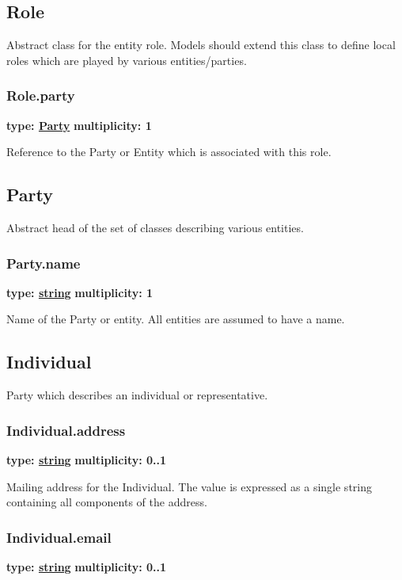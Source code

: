 \subsection{Role}
Abstract class for the entity role. Models should extend this class to define
local roles which are played by various entities/parties.

  \subsubsection{Role.party}
  \textbf{type: \hyperref[sect:party]{Party}} \newline
  \textbf{multiplicity: 1} \newline
  
   Reference to the Party or Entity which is associated with this role.

\subsection{Party}
\label{sect:party}
Abstract head of the set of classes describing various entities.

  \subsubsection{Party.name}
  \textbf{type: \hyperref[sect:ivoa]{string}} \newline
  \textbf{multiplicity: 1} \newline
  
  Name of the Party or entity. All entities are assumed to have a name.
  
\subsection{Individual}
Party which describes an individual or representative.

  \subsubsection{Individual.address}
  \textbf{type: \hyperref[sect:ivoa]{string}} \newline
  \textbf{multiplicity: 0..1} \newline
  
  Mailing address for the Individual. The value is expressed as a single string
  containing all components of the address.
  
  \subsubsection{Individual.email}
  \textbf{type: \hyperref[sect:ivoa]{string}} \newline
  \textbf{multiplicity: 0..1} \newline
  
